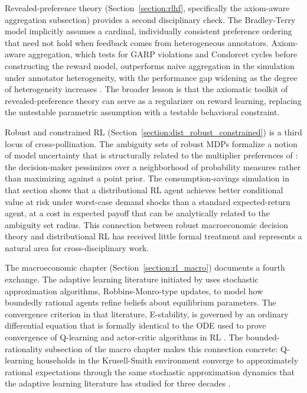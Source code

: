 Revealed-preference theory (Section~\ref{section:rlhf}, specifically the axiom-aware aggregation subsection) provides a second disciplinary check.
The Bradley-Terry model implicitly assumes a cardinal, individually consistent preference ordering that need not hold when feedback comes from heterogeneous annotators.
Axiom-aware aggregation, which tests for GARP violations and Condorcet cycles before constructing the reward model, outperforms naive aggregation in the simulation under annotator heterogeneity, with the performance gap widening as the degree of heterogeneity increases \citep{varian1982nonparametric, skalse2023invariance}.
The broader lesson is that the axiomatic toolkit of revealed-preference theory can serve as a regularizer on reward learning, replacing the untestable parametric assumption with a testable behavioral constraint.

Robust and constrained RL (Section~\ref{section:dist_robust_constrained}) is a third locus of cross-pollination.
The ambiguity sets of robust MDPs formalize a notion of model uncertainty that is structurally related to the multiplier preferences of \citet{HansenSargent2001}: the decision-maker pessimizes over a neighborhood of probability measures rather than maximizing against a point prior.
The consumption-savings simulation in that section shows that a distributional RL agent achieves better conditional value at risk under worst-case demand shocks than a standard expected-return agent, at a cost in expected payoff that can be analytically related to the ambiguity set radius.
This connection between robust macroeconomic decision theory and distributional RL has received little formal treatment and represents a natural area for cross-disciplinary work.

The macroeconomic chapter (Section~\ref{section:rl_macro}) documents a fourth exchange.
The adaptive learning literature initiated by \citet{MarcetSargent1989} uses stochastic approximation algorithms, Robbins-Monro-type updates, to model how boundedly rational agents refine beliefs about equilibrium parameters.
The convergence criterion in that literature, E-stability, is governed by an ordinary differential equation that is formally identical to the ODE used to prove convergence of Q-learning and actor-critic algorithms in RL \citep{borkar2000}.
The bounded-rationality subsection of the macro chapter makes this connection concrete: Q-learning households in the Krusell-Smith environment converge to approximately rational expectations through the same stochastic approximation dynamics that the adaptive learning literature has studied for three decades \citep{KaplanMollViolante2018, MarimonMcGrattanSargent1990}.

